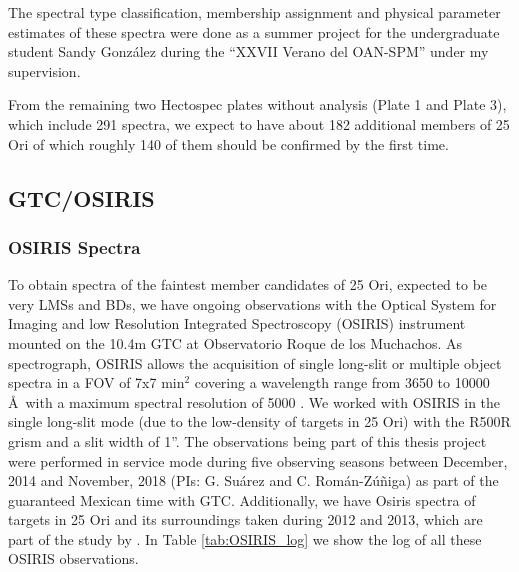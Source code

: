 \documentclass[12pt]{article}
\begin{document}
The spectral type classification, membership assignment and physical parameter estimates of these spectra were done as a summer project for the undergraduate student Sandy Gonz\'alez during the ``XXVII Verano del OAN-SPM'' under my supervision.

From the remaining two Hectospec plates without analysis (Plate 1 and Plate 3), which include 291 spectra, we expect to have about 182 additional members of 25 Ori of which roughly 140 of them should be confirmed by the first time.

\subsection{GTC/OSIRIS}
\label{sec:OSIRIS}

\subsubsection{OSIRIS Spectra}
\label{sec_OSIRIS:spectra}
To obtain spectra of the faintest member candidates of 25 Ori, expected to be very LMSs and BDs, we have ongoing observations with the Optical System for Imaging and low Resolution Integrated Spectroscopy (\ac{OSIRIS}) instrument mounted on the 10.4m GTC at Observatorio Roque de los Muchachos. As spectrograph, OSIRIS allows the acquisition of single long-slit or multiple object spectra in a FOV of 7x7 min$^2$ covering a wavelength range from 3650 to 10000 \AA\ with a maximum spectral resolution of 5000 \citep{Cepa2000,Cepa2003}. We worked with OSIRIS in the single long-slit mode (due to the low-density of targets in 25 Ori) with the R500R grism and a slit width of 1''. The observations being part of this thesis project were performed in service mode during five observing seasons between December, 2014 and November, 2018 (PIs: G. Su\'arez and C. Rom\'an-Z\'u\~niga) as part of the guaranteed Mexican time with GTC. Additionally, we have Osiris spectra of targets in 25 Ori and its surroundings taken during 2012 and 2013, which are part of the study by \citet{Downes2015}. In Table \ref{tab:OSIRIS_log} we show the log of all these OSIRIS observations.
\end{document}
